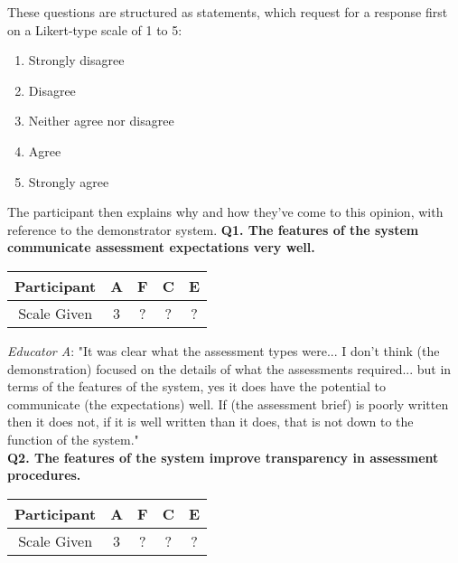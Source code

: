 These questions are structured as statements, which request for a response first on a Likert-type scale of 1 to 5:
\begin{enumerate}
	\setlength\itemsep{0em}    
    \item Strongly disagree
    \item Disagree
    \item Neither agree nor disagree 
    \item Agree
    \item Strongly agree
\end{enumerate}
The participant then explains why and how they've come to this opinion, with reference to the demonstrator system.
\newpage
\textbf{Q1. The features of the system communicate assessment expectations very well.}\\
\begin{table}[!ht] 
    \centering
    \begin{tabularx}{0.325\textwidth}{|c|c|c|c|c|}
        \hline
        Participant & A & F & C & E \\
        \hline
        Scale Given & 3 & ? & ? & ? \\
        \hline
    \end{tabularx}
\end{table}

\textit{Educator A}: "It was clear what the assessment types were... I don't think (the demonstration) 
focused on the details of what the assessments required... but in terms of the features of the system, 
yes it does have the potential to communicate (the expectations) well. If (the assessment brief) is 
poorly written then it does not, if it is well written than it does, that is not down to the function of the system."\\

\textbf{Q2. The features of the system improve transparency in assessment procedures.}\\
\begin{table}[!ht] 
    \centering
    \begin{tabularx}{0.325\textwidth}{|c|c|c|c|c|}
        \hline
        Participant & A & F & C & E \\
        \hline
        Scale Given & 3 & ? & ? & ? \\
        \hline
    \end{tabularx}
\end{table}

